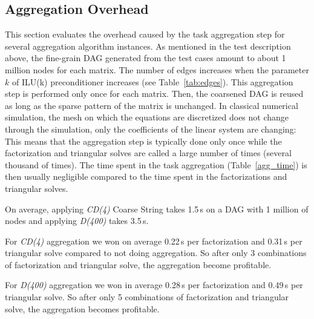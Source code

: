 
\subsection{Aggregation Overhead}
This section evaluates the overhead caused by the task aggregation
step for several aggregation algorithm instances. As mentioned in
the test description above, the fine-grain DAG generated from the
test cases amount to about 1 million nodes for each matrix. The 
number of edges increases when the parameter $k$ of ILU(k) preconditioner increases (see Table~\ref{tab:edges}).
This aggregation step is performed only once for each matrix. Then, the
coarsened DAG is reused as long as the sparse pattern of the matrix is unchanged.
In classical numerical simulation, the mesh on which the equations are discretized
does not change through the simulation, only the coefficients of the linear system
are changing: This means that the aggregation step is typically done only once
while the factorization and triangular solves are called a large number of times (several thousand of times).
The time spent in the task aggregation (Table~\ref{agg_time}) is then usually negligible
compared to the time spent in the factorizations and triangular solves.


On average, applying {\em CD(4)} Coarse String takes 1.5\,s on a DAG with 1 million
of nodes and applying {\em D(400)} takes 3.5\,s.

For {\em CD(4)} aggregation we won on average 0.22\,s per factorization
and 0.31\,s per triangular solve compared to not doing aggregation. So
after only 3 combinations of factorization and triangular solve, the aggregation
become profitable.

For {\em D(400)} aggregation we won in average 0.28\,s per factorization
and 0.49\,s per triangular solve. So after only 5 combinations of factorization
and triangular solve, the aggregation becomes profitable.

